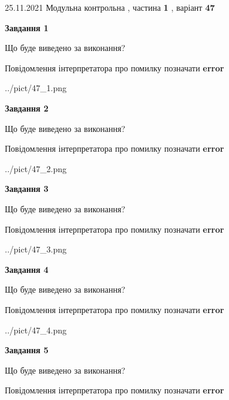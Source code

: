 \documentclass[10pt, ukrainian]{article}
\begin{document}
{25.11.2021 Модульна контрольна , частина \textbf { 1 }, варіант  \No \textbf { 47 }\par}
{
\begin {large}

{\begin {center}\textbf{Завдання 1}\end {center}}\par
Що буде виведено за виконання? \par
Повідомлення інтерпретатора про помилку позначати \textbf{error}

\begin{center}
	{../pict/47_1.png}
\end{center}
\newpage

{\begin {center}\textbf{Завдання 2}\end {center}}\par
Що буде виведено за виконання? \par
Повідомлення інтерпретатора про помилку позначати \textbf{error}

\begin{center}
	{../pict/47_2.png}
\end{center}
\newpage

{\begin {center}\textbf{Завдання 3}\end {center}}\par
Що буде виведено за виконання? \par
Повідомлення інтерпретатора про помилку позначати \textbf{error}

\begin{center}
	{../pict/47_3.png}
\end{center}
\newpage

{\begin {center}\textbf{Завдання 4}\end {center}}\par
Що буде виведено за виконання? \par
Повідомлення інтерпретатора про помилку позначати \textbf{error}

\begin{center}
	{../pict/47_4.png}
\end{center}
\newpage

{\begin {center}\textbf{Завдання 5}\end {center}}\par
Що буде виведено за виконання? \par
Повідомлення інтерпретатора про помилку позначати \textbf{error}


\end{large}}
\end{document}
